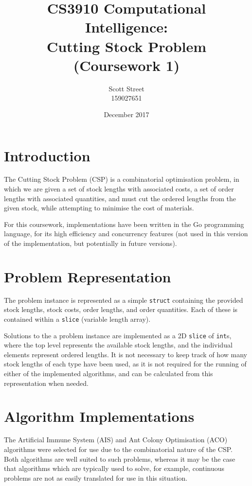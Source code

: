 \documentclass{article}
\title{CS3910 Computational Intelligence:\\Cutting Stock Problem (Coursework 1)}
\author{Scott Street\\{\small 159027651}}
\date{December 2017}
\begin{document}
\maketitle

\section{Introduction}

  The Cutting Stock Problem (CSP) is a combinatorial optimisation problem, in which we are given a set of stock lengths with associated costs, a set of order lengths with associated quantities, and must cut the ordered lengths from the given stock, while attempting to minimise the cost of materials.

  For this coursework, implementations have been written in the Go programming language, for its high efficiency and concurrency features (not used in this version of the implementation, but potentially in future versions).

\section{Problem Representation}

  The problem instance is represented as a simple \lstinline{struct} containing the provided stock lengths, stock costs, order lengths, and order quantities. Each of these is contained within a \lstinline{slice} (variable length array).

  Solutions to the a problem instance are implemented as a 2D \lstinline{slice} of \lstinline{int}s, where the top level represents the available stock lengths, and the individual elements represent ordered lengths. It is not necessary to keep track of how many stock lengths of each type have been used, as it is not required for the running of either of the implemented algorithms, and can be calculated from this representation when needed.

\section{Algorithm Implementations}

  The Artificial Immune System (AIS) and Ant Colony Optimisation (ACO) algorithms were selected for use due to the combinatorial nature of the CSP. Both algorithms are well suited to such problems, whereas it may be the case that algorithms which are typically used to solve, for example, continuous problems are not as easily translated for use in this situation.
\end{document}
